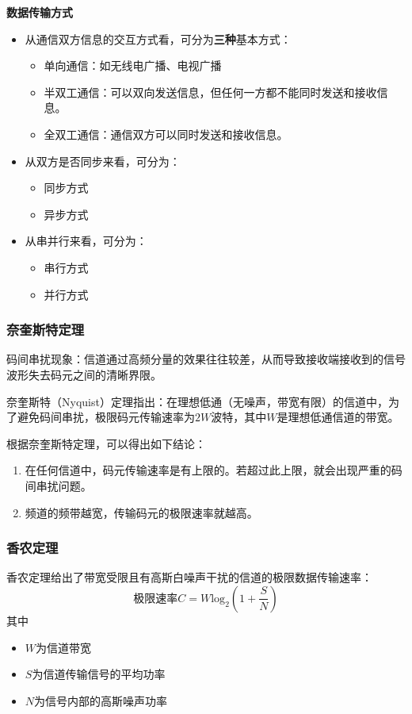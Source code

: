 \documentclass[12pt, a4paper, oneside]{ctexart}
\begin{document}
\textbf{数据传输方式}
\begin{itemize}
    \item 从通信双方信息的交互方式看，可分为\textbf{三种}基本方式：
    \begin{itemize}
        \item 单向通信：如无线电广播、电视广播
        \item 半双工通信：可以双向发送信息，但任何一方都不能同时发送和接收信息。
        \item 全双工通信：通信双方可以同时发送和接收信息。
    \end{itemize}
    \item 从双方是否同步来看，可分为：
    \begin{itemize}
        \item 同步方式
        \item 异步方式
    \end{itemize}
    \item 从串并行来看，可分为：
    \begin{itemize}
        \item 串行方式
        \item 并行方式
    \end{itemize}
\end{itemize}

\subsubsection{奈奎斯特定理}

码间串扰现象：信道通过高频分量的效果往往较差，从而导致接收端接收到的信号波形失去码元之间的清晰界限。

奈奎斯特（Nyquist）定理指出：在理想低通（无噪声，带宽有限）的信道中，为了避免码间串扰，极限码元传输速率为$2W$波特，其中$W$是理想低通信道的带宽。

根据奈奎斯特定理，可以得出如下结论：
\begin{enumerate}
    \item 在任何信道中，码元传输速率是有上限的。若超过此上限，就会出现严重的码间串扰问题。
    \item 频道的频带越宽，传输码元的极限速率就越高。
\end{enumerate}

\subsubsection{香农定理}

香农定理给出了带宽受限且有高斯白噪声干扰的信道的极限数据传输速率：
\begin{equation*}
    \text{极限速率}C=W\text{log}_2(1+\frac{S}{N})
\end{equation*}
其中
\begin{itemize}
    \item $W$为信道带宽
    \item $S$为信道传输信号的平均功率
    \item $N$为信号内部的高斯噪声功率
\end{itemize}
\end{document}
